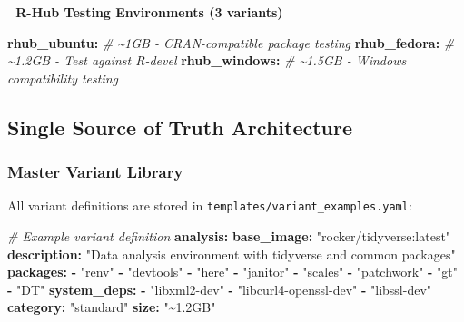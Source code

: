\documentclass[
]{article}
\newenvironment{Shaded}{\begin{snugshade}}{\end{snugshade}}
\newcommand{\AttributeTok}[1]{\textcolor[rgb]{0.13,0.29,0.53}{#1}}
\newcommand{\CommentTok}[1]{\textcolor[rgb]{0.56,0.35,0.01}{\textit{#1}}}
\newcommand{\FunctionTok}[1]{\textcolor[rgb]{0.13,0.29,0.53}{\textbf{#1}}}
\newcommand{\KeywordTok}[1]{\textcolor[rgb]{0.13,0.29,0.53}{\textbf{#1}}}
\newcommand{\StringTok}[1]{\textcolor[rgb]{0.31,0.60,0.02}{#1}}
\begin{document}
\textbf{🧪 R-Hub Testing Environments (3 variants)}

\begin{Shaded}
\begin{Highlighting}[]
\FunctionTok{rhub\_ubuntu}\KeywordTok{:}\CommentTok{      \# \textasciitilde{}1GB    {-} CRAN{-}compatible package testing}
\FunctionTok{rhub\_fedora}\KeywordTok{:}\CommentTok{      \# \textasciitilde{}1.2GB  {-} Test against R{-}devel}
\FunctionTok{rhub\_windows}\KeywordTok{:}\CommentTok{     \# \textasciitilde{}1.5GB  {-} Windows compatibility testing}
\end{Highlighting}
\end{Shaded}

\subsection{Single Source of Truth
Architecture}\label{single-source-of-truth-architecture}

\subsubsection{Master Variant Library}\label{master-variant-library}

All variant definitions are stored in
\texttt{templates/variant\_examples.yaml}:

\begin{Shaded}
\begin{Highlighting}[]
\CommentTok{\# Example variant definition}
\FunctionTok{analysis}\KeywordTok{:}
\AttributeTok{  }\FunctionTok{base\_image}\KeywordTok{:}\AttributeTok{ }\StringTok{"rocker/tidyverse:latest"}
\AttributeTok{  }\FunctionTok{description}\KeywordTok{:}\AttributeTok{ }\StringTok{"Data analysis environment with tidyverse and common packages"}
\AttributeTok{  }\FunctionTok{packages}\KeywordTok{:}
\AttributeTok{    }\KeywordTok{{-}}\AttributeTok{ }\StringTok{"renv"}
\AttributeTok{    }\KeywordTok{{-}}\AttributeTok{ }\StringTok{"devtools"}
\AttributeTok{    }\KeywordTok{{-}}\AttributeTok{ }\StringTok{"here"}
\AttributeTok{    }\KeywordTok{{-}}\AttributeTok{ }\StringTok{"janitor"}
\AttributeTok{    }\KeywordTok{{-}}\AttributeTok{ }\StringTok{"scales"}
\AttributeTok{    }\KeywordTok{{-}}\AttributeTok{ }\StringTok{"patchwork"}
\AttributeTok{    }\KeywordTok{{-}}\AttributeTok{ }\StringTok{"gt"}
\AttributeTok{    }\KeywordTok{{-}}\AttributeTok{ }\StringTok{"DT"}
\AttributeTok{  }\FunctionTok{system\_deps}\KeywordTok{:}
\AttributeTok{    }\KeywordTok{{-}}\AttributeTok{ }\StringTok{"libxml2{-}dev"}
\AttributeTok{    }\KeywordTok{{-}}\AttributeTok{ }\StringTok{"libcurl4{-}openssl{-}dev"}
\AttributeTok{    }\KeywordTok{{-}}\AttributeTok{ }\StringTok{"libssl{-}dev"}
\AttributeTok{  }\FunctionTok{category}\KeywordTok{:}\AttributeTok{ }\StringTok{"standard"}
\AttributeTok{  }\FunctionTok{size}\KeywordTok{:}\AttributeTok{ }\StringTok{"\textasciitilde{}1.2GB"}
\end{Highlighting}
\end{Shaded}
\end{document}
